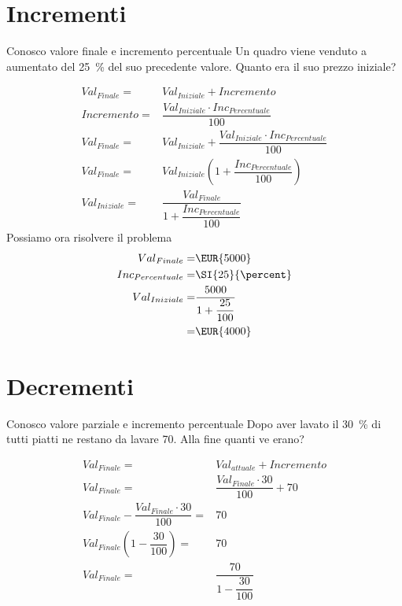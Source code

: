 \section{Incrementi}
	\begin{esempiot}{Conosco valore finale e incremento percentuale}{}
Un quadro viene venduto a   aumentato del \SI{25}{\percent} del suo precedente valore. Quanto era il suo prezzo iniziale?
\end{esempiot}
\begin{align*}
	{Val}_{Finale}=&{Val}_{Iniziale}+Incremento\\
	Incremento=&\dfrac{{Val}_{Iniziale}\cdot {Inc}_{Percentuale} }{100}\\
	{Val}_{Finale}=&{Val}_{Iniziale}+\dfrac{{Val}_{Iniziale}\cdot {Inc}_{Percentuale} }{100}\\
	{Val}_{Finale}=&{Val}_{Iniziale}\left(1+\dfrac{{Inc}_{Percentuale} }{100}\right)\\
	{Val}_{Iniziale}=&\dfrac{{Val}_{Finale}}{1+\dfrac{{Inc}_{Percentuale} }{100}}
\end{align*}
Possiamo ora risolvere il problema
\begin{align*}
	{Val}_{Finale}=&\mbox{\EUR{5000}}\\
	{Inc}_{Percentuale}=&\SI{25}{\percent}\\
	{Val}_{Iniziale}=&\dfrac{5000}{1+\dfrac{25}{100}}\\
	=&\mbox{\EUR{4000}}\\
\end{align*}
\section{Decrementi}
	\begin{esempiot}{Conosco valore parziale e incremento percentuale}{}
Dopo aver lavato il \SI{30}{\percent} di tutti piatti ne restano da lavare \num{70}. Alla fine quanti ve erano?
\end{esempiot}
\begin{align*}
	{Val}_{Finale}=&{Val}_{attuale}+Incremento\\
	{Val}_{Finale}=&\dfrac{{Val}_{Finale}\cdot 30}{100}+70\\
	{Val}_{Finale}-\dfrac{{Val}_{Finale}\cdot 30}{100}=&70\\
	{Val}_{Finale}\left(1-\dfrac{30}{100}\right)=&70\\
	{Val}_{Finale}=&\dfrac{70}{1-\dfrac{30}{100}}\\
\end{align*}